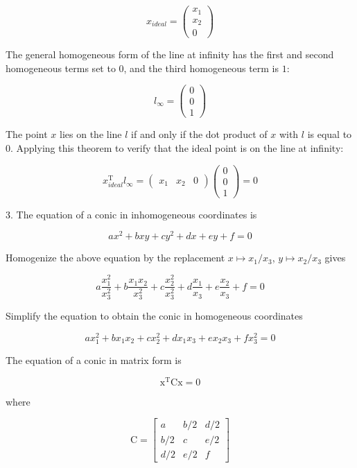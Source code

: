 \documentclass[conference]{IEEEtran}
\begin{document}
\[ x_{ideal} = \begin{pmatrix} x_1\\x_2\\0 \end{pmatrix} \]

The general homogeneous form of the line at infinity has the first and second homogeneous terms set to \(0\), and the third homogeneous term is \(1\):

\[ l_{\infty} = \begin{pmatrix} 0\\0\\1 \end{pmatrix} \]

The point \(x\) lies on the line \(l\) if and only if the dot product of \(x\) with \(l\) is equal to \(0\). Applying this theorem to verify that the ideal point is on the line at infinity:

\[ x_{ideal}^\mathrm{T}l_{\infty} = 
\begin{pmatrix}
x_1 & x_2 & 0
\end{pmatrix}\begin{pmatrix} 0\\0\\1 \end{pmatrix} 
= 0 \]

3. The equation of a conic in inhomogeneous coordinates is

\[ ax^2 + bxy + cy^2 + dx + ey + f = 0 \]

Homogenize the above equation by the replacement \(x \mapsto x_1/x_3\), \(y \mapsto x_2/x_3\) gives

\[ a\frac{x_1^2}{x_3^2} + b\frac{x_1x_2}{x_3^2} + c\frac{x_2^2}{x_3^2} + 
d\frac{x_1}{x_3} + e\frac{x_2}{x_3} + f = 0 \]

Simplify the equation to obtain the conic in homogeneous coordinates

\[ ax_1^2 + bx_1x_2 + cx_2^2 + dx_1x_3 + ex_2x_3 + fx_3^2 = 0 \]

The equation of a conic in matrix form is 

\[ \mathrm{x}^\mathrm{T}\mathrm{C}\mathrm{x} = 0 \]

where 

\[ \mathrm{C} = \begin{bmatrix}
a & b/2 & d/2\\
b/2 & c & e/2\\
d/2 & e/2 & f
\end{bmatrix} \]

\clearpage
\end{document}
